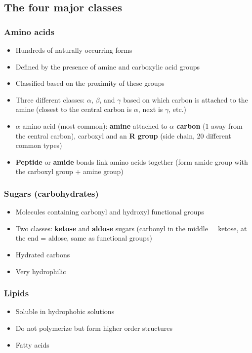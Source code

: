\documentclass[letterpaper, 12pt]{article}
\begin{document}
\subsection*{The four major classes}

\subsubsection*{Amino acids}

\begin{itemize}
\item Hundreds of naturally occurring forms
\item Defined by the presence of amine and carboxylic acid groups
\item Classified based on the proximity of these groups
\item Three different classes: $\alpha$, $\beta$, and $\gamma$ based on which carbon is attached to the amine (closest to the central carbon is $\alpha$, next is $\gamma$, etc.)
\item $\alpha$ amino acid (most common): \textbf{amine} attached to \textbf{$\alpha$ carbon} (1 away from the central carbon), carboxyl and an \textbf{R group} (side chain, 20 different common types)
\item \textbf{Peptide} or \textbf{amide} bonds link amino acids together (form amide group with the carboxyl group + amine group)
\end{itemize}

\subsubsection*{Sugars (carbohydrates)}

\begin{itemize}
\item Molecules containing carbonyl and hydroxyl functional groups
\item Two classes: \textbf{ketose} and \textbf{aldose} sugars (carbonyl in the middle = ketose, at the end = aldose, same as functional groups)
\item Hydrated carbons
\item Very hydrophilic
\end{itemize}

\subsubsection*{Lipids}

\begin{itemize}
\item Soluble in hydrophobic solutions
\item Do not polymerize but form higher order structures
\item Fatty acids
\end{itemize}
\end{document}
